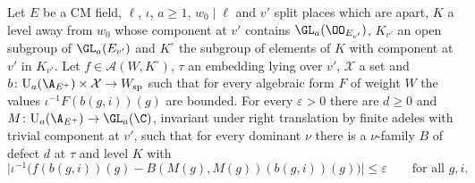 \begin{proposition}\label{pf:galred:famex}
Let $E$ be a CM field, $\ell$, $\iota$, $a\ge1$, $w_0\mid\ell$ and $v'$ split places which are apart, $K$ a level away from
$w_0$ whose component at $v'$ contains $\GL_a(\OO_{E_{v'}})$, $K_{v'}$ an open subgroup of $\GL_a(E_{v'})$ and $K^\circ$
the subgroup of elements of $K$ with component at $v'$ in $K_{v'}$. Let $f\in\mathcal A(W,K^\circ)$, $\tau$ an embedding
lying over $v'$, $\mathcal X$ a set and $b\colon\galredU_a(\A_{E^+})\times\mathcal X\to W_{\mathrm{sp}}$ such that for every
algebraic form $F$ of weight $W$ the values $\iota^{-1}F(b(g,i))(g)$ are bounded. For every $\varepsilon>0$ there are $d\ge0$
and $M\colon\galredU_a(\A_{E^+})\to\GL_a(\C)$, invariant under right translation by finite adeles with trivial component at
$v'$, such that for every dominant $\nu$ there is a $\nu$-family $B$ of defect $d$ at $\tau$ and level $K$ with
\[
  \bigl|\iota^{-1}\bigl(f(b(g,i))(g)-B(M(g),M(g))(b(g,i))(g)\bigr)\bigr|\le\varepsilon\qquad\text{for all }g,i.
\]
\end{proposition}

